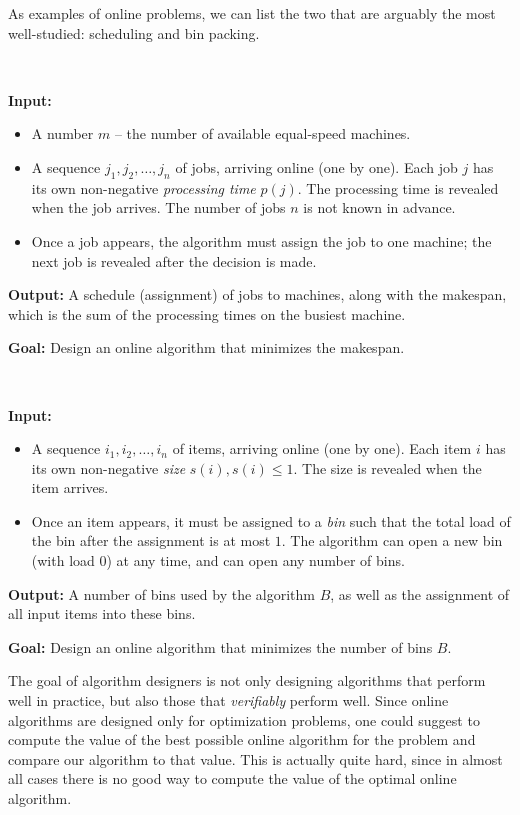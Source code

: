 As examples of online problems, we can list the two that are arguably
the most well-studied: scheduling and bin packing.

\begin{prb}[\scheduling]~
\smallskip

\noindent\textbf{Input:}
\begin{itemize}
\item A number $m$ -- the number of available equal-speed machines.
\item A sequence $j_1, j_2, …, j_n$ of jobs, arriving online (one by one). Each job $j$ has its own non-negative \emph{processing time} $p(j)$. The processing time is revealed when the job arrives. The number of jobs $n$ is not known in advance.
\item Once a job appears, the algorithm must assign the job to one machine; the next job is revealed after the decision is made.
\end{itemize}

\noindent\textbf{Output:} A schedule (assignment) of jobs to machines,
along with the makespan, which is the sum of the processing times on
the busiest machine.

\noindent\textbf{Goal:} Design an online algorithm that minimizes the
makespan.
\end{prb}

\begin{prb}[\binpacking]~
\smallskip

\noindent\textbf{Input:}
\begin{itemize}
\item A sequence $i_1, i_2, …, i_n$ of items, arriving online (one by one). Each item $i$ has its own non-negative \emph{size} $s(i), s(i) \le 1$. The size is revealed when the item arrives.
\item Once an item appears, it must be assigned to a \emph{bin} such that the total load of the bin after the assignment is at most $1$. The algorithm can open a new bin (with load $0$) at any time, and can open any number of bins.
\end{itemize}

\noindent\textbf{Output:} A number of bins used by the algorithm $B$, as well as
the assignment of all input items into these bins.

\noindent\textbf{Goal:} Design an online algorithm that minimizes the number of bins $B$.
\end{prb}

\medskip

The goal of algorithm designers is not only designing algorithms that
perform well in practice, but also those that \emph{verifiably}
perform well. Since online algorithms are designed only for
optimization problems, one could suggest to compute the value of the
best possible online algorithm for the problem and compare our
algorithm to that value. This is actually quite hard, since in almost
all cases there is no good way to compute the value of the optimal
online algorithm.

